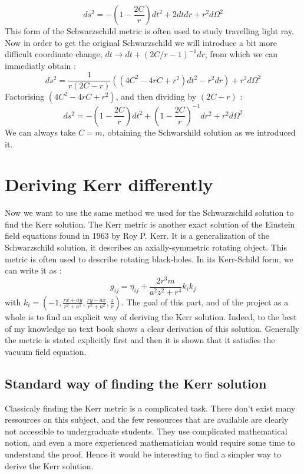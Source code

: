 \documentclass[a4paper,12pt]{article}
\theoremstyle{definition}
\begin{document}
\begin{equation}
	ds^2=-(1-\frac{2C}{r})dt^2+2dtdr+r^2d\Omega^2
\end{equation}
This form of the Schwarzschild metric is often used to study travelling light ray.
Now in order to get the original Schwarzschild we will introduce a bit more difficult coordinate change, $dt\rightarrow dt+(2C/r-1)^{-1}dr$, from which we can immediatly obtain :
\begin{equation}
	ds^2=\frac{1}{r(2C-r)}((4C^2-4rC+r^2)dt^2-r^2dr)+r^2d\Omega^2
\end{equation}
Factorising $(4C^2-4rC+r^2)$, and then dividing by $(2C-r)$ :
\begin{equation}
	ds^2=-(1-\frac{2C}{r})dt^2+(1-\frac{2C}{r})^{-1}dr^2+r^2d\Omega^2
\end{equation}
We can always take $C=m$, obtaining the Schwarshild solution as we introduced it.

\section{Deriving Kerr differently}
Now we want to use the same method we used for the Schwarzschild solution to find the Kerr solution.
The Kerr metric is another exact solution of the Einstein field equations found in 1963 by Roy P. Kerr.
It is a generalization of the Schwarzschild solution, it describes an axially-symmetric rotating object.
This metric is often used to describe rotating black-holes.
In its Kerr-Schild form, we can write it as :
\begin{equation}
	g_{ij}=\eta_{ij}+\frac{2r^3m}{a^2 z^2+r^4}k_ik_j
\end{equation}
with $k_i=(-1,\frac{r x + a y}{r^2 + a^2},\frac{ry-ax}{r^2+a^2},\frac{z}{r})$.
The goal of this part, and of the project as a whole is to find an explicit way of deriving the Kerr solution.
Indeed, to the best of my knowledge no text book shows a clear derivation of this solution.
Generally the metric is stated explicitly first and then it is shown that it satisfies the vacuum field equation.
\subsection{Standard way of finding the Kerr solution}
Classicaly finding the Kerr metric is a complicated task.
There don't exist many ressources on this subject, and the few ressources that are available are clearly not accessible to undergraduate students.
They use complicated mathematical notion, and even a more experienced mathematician would require some time to understand the proof.
Hence it would be interesting to find a simpler way to derive the Kerr solution.
\end{document}
